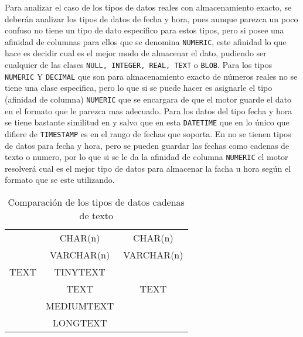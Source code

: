 Para analizar el caso de los tipos de datos reales con almacenamiento exacto, se deberán analizar los tipos de datos de fecha y hora, pues aunque parezca un poco confuso \s no tiene un tipo de dato especifico para estos tipos, pero si posee una afinidad de columnas para ellos que se denomina \verb=NUMERIC=, este afinidad lo que hace es decidir cual es el mejor modo de almacenar el dato, pudiendo ser cualquier de las clases \verb=NULL, INTEGER, REAL, TEXT= o \verb=BLOB=. Para los tipos \verb=NUMERIC= Y \verb=DECIMAL= que son para almacenamiento exacto de números reales no se tiene una clase especifica, pero lo que si se puede hacer es asignarle el tipo (afinidad de columna) \verb=NUMERIC= que se encargara de que el motor guarde el dato en el formato que le parezca mas adecuado. Para los datos del tipo fecha y hora se tiene bastante similitud  en \m y \p salvo que en \m esta \verb=DATETIME= que en lo único que difiere de \verb=TIMESTAMP= es en el rango de fechas que soporta. En \s no se tienen tipos de datos para fecha y hora, pero se pueden guardar las fechas como cadenas de texto o numero, por lo que si se le da la afinidad de columna \verb=NUMERIC= el motor resolverá cual es el mejor tipo de datos para almacenar la facha u hora según el formato que se este utilizando.   
%
\begin{table}[h]
\begin{center}
\begin{tabular}{|c|c|c|}
\hline \s & \m & \p \\ 
\hline  & CHAR(n) & CHAR(n) \\  
    & VARCHAR(n) & VARCHAR(n) \\ 
  TEXT   & TINYTEXT &  \\  
    & TEXT & TEXT \\
    & MEDIUMTEXT &  \\  
    & LONGTEXT &  \\  
\hline 
\end{tabular} 
\end{center}
\caption{Comparación de los tipos de datos cadenas de texto}
\end{table}
%

